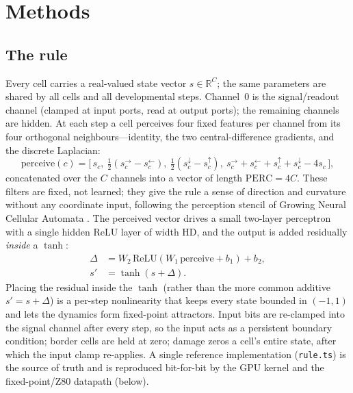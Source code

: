 \section{Methods}

\subsection*{The rule}

Every cell carries a real-valued state vector $s \in \mathbb{R}^{C}$; the same parameters are shared by all cells and all developmental steps. Channel~0 is the signal/readout channel (clamped at input ports, read at output ports); the remaining channels are hidden. At each step a cell perceives four fixed features per channel from its four orthogonal neighbours---identity, the two central-difference gradients, and the discrete Laplacian:
\begin{equation}
\mathrm{perceive}(c) = \Big[\, s_c,\ \tfrac{1}{2}(s^{\to}_c - s^{\leftarrow}_c),\ \tfrac{1}{2}(s^{\downarrow}_c - s^{\uparrow}_c),\ s^{\to}_c + s^{\leftarrow}_c + s^{\uparrow}_c + s^{\downarrow}_c - 4 s_c \,\Big],
\end{equation}
concatenated over the $C$ channels into a vector of length $\mathrm{PERC}=4C$. These filters are fixed, not learned; they give the rule a sense of direction and curvature without any coordinate input, following the perception stencil of Growing Neural Cellular Automata \citep{mordvintsev2020growing}. The perceived vector drives a small two-layer perceptron with a single hidden ReLU layer of width $\mathrm{HD}$, and the output is added residually \emph{inside} a $\tanh$:
\begin{align}
\Delta &= W_2\,\mathrm{ReLU}\!\left(W_1\,\mathrm{perceive} + b_1\right) + b_2, \\
s' &= \tanh\!\left(s + \Delta\right).
\end{align}
Placing the residual inside the $\tanh$ (rather than the more common additive $s' = s + \Delta$) is a per-step nonlinearity that keeps every state bounded in $(-1,1)$ and lets the dynamics form fixed-point attractors. Input bits are re-clamped into the signal channel after every step, so the input acts as a persistent boundary condition; border cells are held at zero; damage zeros a cell's entire state, after which the input clamp re-applies. A single reference implementation (\texttt{rule.ts}) is the source of truth and is reproduced bit-for-bit by the GPU kernel and the fixed-point/Z80 datapath (below).

